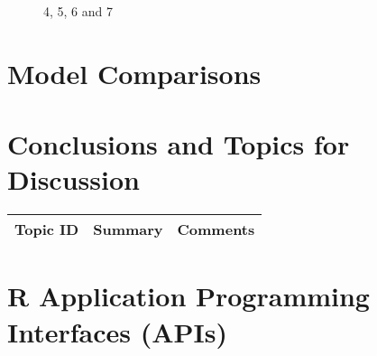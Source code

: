 \begin{figure}[H]
	\centering
	\begin{minipage}[b]{0.5\linewidth}
	\end{minipage}\hfill
	\begin{minipage}[b]{0.5\linewidth}
	\end{minipage}\hfill	
	\begin{minipage}[b]{0.5\linewidth}
	\end{minipage}\hfill
	\begin{minipage}[b]{0.5\linewidth}
	\end{minipage}\hfill
	\caption{4, 5, 6 and 7}
	\label{fig:Figure2}
\end{figure} 

\section{Model Comparisons}

\section{Conclusions and Topics for Discussion}

\begin{table}[H]\centering
	\begin{tabular}{p{1cm}p{4cm}p{3cm}}
		Topic ID & Summary & Comments\\
		\hline
		\hline
	\end{tabular}
\end{table}

\section{R Application Programming Interfaces (APIs)}


